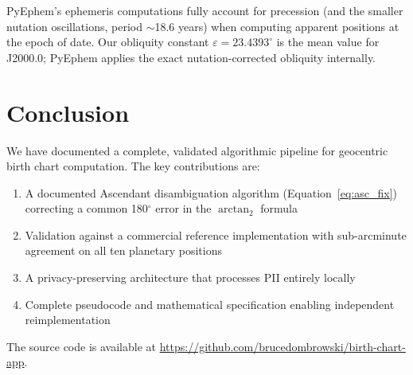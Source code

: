 \documentclass[11pt,letterpaper,twocolumn]{article}
\begin{document}
PyEphem's ephemeris computations fully account for precession (and the smaller nutation oscillations, period $\sim$18.6 years) when computing apparent positions at the epoch of date. Our obliquity constant $\varepsilon = 23.4393^\circ$ is the mean value for J2000.0; PyEphem applies the exact nutation-corrected obliquity internally.

\section{Conclusion}

We have documented a complete, validated algorithmic pipeline for geocentric birth chart computation. The key contributions are:

\begin{enumerate}[nosep]
    \item A documented Ascendant disambiguation algorithm (Equation~\ref{eq:asc_fix}) correcting a common 180$^\circ$ error in the $\arctan_2$ formula
    \item Validation against a commercial reference implementation with sub-arcminute agreement on all ten planetary positions
    \item A privacy-preserving architecture that processes PII entirely locally
    \item Complete pseudocode and mathematical specification enabling independent reimplementation
\end{enumerate}

The source code is available at \url{https://github.com/brucedombrowski/birth-chart-app}.
\end{document}
